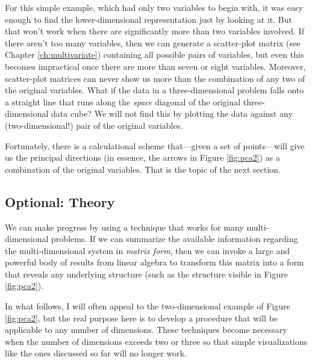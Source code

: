 For this simple example, which had only two variables to begin with,
it was easy enough to find the lower-dimensional representation just
by looking at it. But that won't work when there are significantly
more than two variables involved. If there aren't too many variables,
then we can generate a scatter-plot matrix (see Chapter
\ref{ch:multivariate}) containing all possible pairs of variables, but
even this becomes impractical once there are more than seven or eight
variables.  Moreover, scatter-plot matrices can never show us more
than the combination of any two of the original variables. What if the
data in a three-dimensional problem falls onto a straight line that
runs along the \emph{space} diagonal of the original three-dimensional
data cube? We will not find this by plotting the data against any
(two-dimensional!) pair of the original variables.

Fortunately, there is a calculational scheme that---given a set of
points---will give us the principal directions (in essence, the arrows
in Figure \ref{fig:pca2}) as a combination of the original variables.
That is the topic of the next section.


\subsection{Optional: Theory}

 
We can make progress by using a technique that works for many
multi-dimensional problems. If we can summarize the available
information regarding the multi-dimensional system in \emph{matrix
  form}, then we can invoke\vadjust{\pagebreak} a large and powerful body of results
from linear algebra to transform this matrix into a form that reveals any
underlying structure (such as the structure visible in Figure
\ref{fig:pca2}).

In what follows, I will often appeal to the two-dimensional example of
Figure \ref{fig:pca2}, but the real purpose here is to develop a
procedure that will be applicable to any number of dimensions. These
techniques become necessary when the number of dimensions exceeds two
or three so that simple visualizations like the ones discussed so far
will no longer work.

